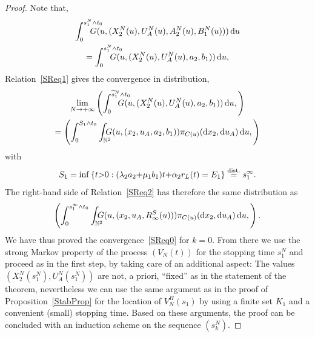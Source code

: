 \documentclass[english]{amsart}
\newcommand{\N}{\ensuremath{\mathbb{N}}}
\newcommand{\diff}{\mathop{}\mathopen{}\mathrm{d}}
\newcommand\steq[1]{\stackrel{\text{\rm #1.}}{=}}
\numberwithin{proposition}{section}
\begin{document}
\begin{proof}
Note that,
\begin{multline*}
  \int_{0}^{s_{1}^N{\wedge}t_0}\hspace{-6mm} G(u,(X_2^N(u),U_A^N(u), A_2^N(u),B_1^N(u)))\diff u
\\  = \int_{0}^{s_{1}^N{\wedge}t_0}\hspace{-6mm} G(u,(X_2^N(u),U_A^N(u), a_2,b_1))\diff u,
\end{multline*}
 Relation~\eqref{SReq1} gives the convergence in distribution,
\begin{multline}\label{SReq2}
 \lim_{N\to+\infty} \left( \int_{0}^{\widetilde{s}_{1}^N{\wedge}t_0}\hspace{-6mm} G(u,(X_2^N(u),U_A^N(u), a_2,b_1))\diff u,\right)
\\ = \left( \int_{0}^{S_1{\wedge}t_0}\int_{\N^2}\hspace{-3mm} G(u,(x_2,u_A, a_2,b_1))\pi_{C(u)}(\diff x_2,\diff u_A) \diff u,\right)
\end{multline}
 with
 \[
 S_1=\inf\left\{t{>}0: (\lambda_2a_2{+}\mu_1b_1)t{+}\alpha_2 r_L(t) =E_1\right\}\steq{dist} s_1^\infty.
 \]
 The right-hand side of Relation~\eqref{SReq2} has therefore the same distribution as
 \[
  \left( \int_{0}^{s_1^\infty{\wedge}t_0}\int_{\N^2}\hspace{-3mm} G(u,(x_2,u_A, R_\infty^S(u)))\pi_{C(u)}(\diff x_2,\diff u_A) \diff u,\right).
  \]
  We have thus proved the convergence~\eqref{SReq0} for $k=0$. From there we use the strong Markov property of the process $(V_N(t))$ for the stopping time $s_1^N$ and proceed as in the first step, by taking care of an additional aspect: The values $(X_2^N(s_1^N),U_A^N(s_1^N))$  are not, a priori, ``fixed'' as in the statement of the theorem, nevertheless we can use the same argument as in the proof of Proposition~\ref{StabProp} for the location of $V_N^H(s_1)$ by using a finite set $K_1$ and a convenient (small) stopping time. Based on these arguments, the proof can be concluded with an induction scheme on the sequence $(s_k^N)$.
\end{proof}
\end{document}
